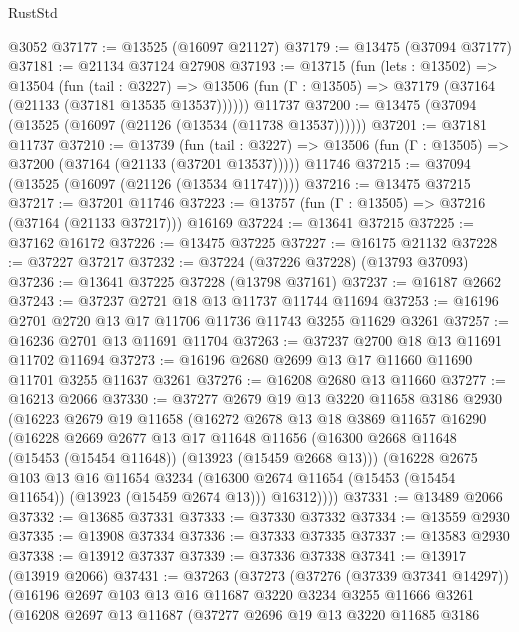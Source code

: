 \begin{lexlean}{RustStd}
\begin{coremodule}
    @3052
@37177 := @13525 (@16097 @21127)
@37179 := @13475 (@37094 @37177)
@37181 := @21134 @37124 @27908
@37193 := @13715
    (fun (lets : @13502) =>
    @13504
      (fun (tail : @3227) =>
      @13506 (fun (Γ : @13505) => @37179 (@37164 (@21133 (@37181 @13535 @13537))))))
    @11737
@37200 := @13475 (@37094 (@13525 (@16097 (@21126 (@13534 (@11738 @13537))))))
@37201 := @37181 @11737
@37210 := @13739
    (fun (tail : @3227) => @13506 (fun (Γ : @13505) => @37200 (@37164 (@21133 (@37201 @13537)))))
    @11746
@37215 := @37094 (@13525 (@16097 (@21126 (@13534 @11747))))
@37216 := @13475 @37215
@37217 := @37201 @11746
@37223 := @13757 (fun (Γ : @13505) => @37216 (@37164 (@21133 @37217))) @16169
@37224 := @13641 @37215
@37225 := @37162 @16172
@37226 := @13475 @37225
@37227 := @16175 @21132
@37228 := @37227 @37217
@37232 := @37224 (@37226 @37228) (@13793 @37093)
@37236 := @13641 @37225 @37228 (@13798 @37161)
@37237 := @16187 @2662
@37243 := @37237 @2721 @18 @13 @11737 @11744 @11694
@37253 := @16196 @2701 @2720 @13 @17 @11706 @11736 @11743 @3255 @11629 @3261
@37257 := @16236 @2701 @13 @11691 @11704
@37263 := @37237 @2700 @18 @13 @11691 @11702 @11694
@37273 := @16196 @2680 @2699 @13 @17 @11660 @11690 @11701 @3255 @11637 @3261
@37276 := @16208 @2680 @13 @11660
@37277 := @16213 @2066
@37330 := @37277
    @2679
    @19
    @13
    @3220
    @11658
    @3186
    @2930
    (@16223
      @2679
      @19
      @11658
      (@16272
        @2678
        @13
        @18
        @3869
        @11657
        @16290
        (@16228
          @2669
          @2677
          @13
          @17
          @11648
          @11656
          (@16300 @2668 @11648 (@15453 (@15454 @11648)) (@13923 (@15459 @2668 @13)))
          (@16228
            @2675
            @103
            @13
            @16
            @11654
            @3234
            (@16300 @2674 @11654 (@15453 (@15454 @11654)) (@13923 (@15459 @2674 @13)))
            @16312))))
@37331 := @13489 @2066
@37332 := @13685 @37331
@37333 := @37330 @37332
@37334 := @13559 @2930
@37335 := @13908 @37334
@37336 := @37333 @37335
@37337 := @13583 @2930
@37338 := @13912 @37337
@37339 := @37336 @37338
@37341 := @13917 (@13919 @2066)
@37431 := @37263
    (@37273
      (@37276 (@37339 @37341 @14297))
      (@16196
        @2697
        @103
        @13
        @16
        @11687
        @3220
        @3234
        @3255
        @11666
        @3261
        (@16208
          @2697
          @13
          @11687
          (@37277
            @2696
            @19
            @13
            @3220
            @11685
            @3186

\end{coremodule}
\end{lexlean}
